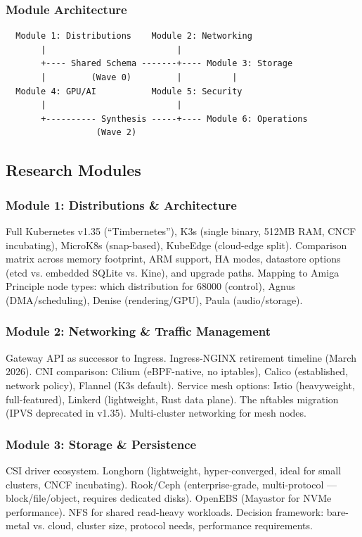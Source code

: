 \documentclass[11pt,letterpaper]{article}
\begin{document}
\subsubsection{Module Architecture}

\begin{asciibox}
\begin{verbatim}
  Module 1: Distributions    Module 2: Networking
       |                          |
       +---- Shared Schema -------+---- Module 3: Storage
       |         (Wave 0)         |          |
  Module 4: GPU/AI           Module 5: Security
       |                          |
       +---------- Synthesis -----+---- Module 6: Operations
                  (Wave 2)
\end{verbatim}
\end{asciibox}

\subsection{Research Modules}

\subsubsection{Module 1: Distributions \& Architecture}
Full Kubernetes v1.35 (``Timbernetes''), K3s (single binary, 512MB RAM, CNCF incubating), MicroK8s (snap-based), KubeEdge (cloud-edge split). Comparison matrix across memory footprint, ARM support, HA modes, datastore options (etcd vs. embedded SQLite vs. Kine), and upgrade paths. Mapping to Amiga Principle node types: which distribution for 68000 (control), Agnus (DMA/scheduling), Denise (rendering/GPU), Paula (audio/storage).

\subsubsection{Module 2: Networking \& Traffic Management}
Gateway API as successor to Ingress. Ingress-NGINX retirement timeline (March 2026). CNI comparison: Cilium (eBPF-native, no iptables), Calico (established, network policy), Flannel (K3s default). Service mesh options: Istio (heavyweight, full-featured), Linkerd (lightweight, Rust data plane). The nftables migration (IPVS deprecated in v1.35). Multi-cluster networking for mesh nodes.

\subsubsection{Module 3: Storage \& Persistence}
CSI driver ecosystem. Longhorn (lightweight, hyper-converged, ideal for small clusters, CNCF incubating). Rook/Ceph (enterprise-grade, multi-protocol --- block/file/object, requires dedicated disks). OpenEBS (Mayastor for NVMe performance). NFS for shared read-heavy workloads. Decision framework: bare-metal vs. cloud, cluster size, protocol needs, performance requirements.
\end{document}
